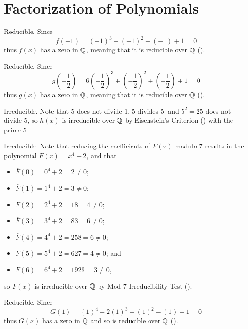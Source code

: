 \section{Factorization of Polynomials}
\begin{questions}
    \item \begin{partquestions}{\alph*}
        \item Reducible. Since
        \[
            f(-1) = (-1)^3 + (-1)^2 + (-1) + 1 = 0
        \]
        thus $f(x)$ has a zero in $\mathbb{Q}$, meaning that it is reducible over $\mathbb{Q}$ ().
        
        \item Reducible. Since
        \[
            g\left(-\frac12\right) = 6\left(-\frac12\right)^3 + \left(-\frac12\right)^2 + \left(-\frac12\right) + 1 = 0
        \]
        thus $g(x)$ has a zero in $\mathbb{Q}$, meaning that it is reducible over $\mathbb{Q}$ ().

        \item Irreducible. Note that 5 does not divide 1, 5 divides 5, and $5^2 = 25$ does not divide 5, so $h(x)$ is irreducible over $\mathbb{Q}$ by Eisenstein's Criterion () with the prime 5.
        
        \item Irreducible. Note that reducing the coefficients of $F(x)$ modulo 7 results in the polynomial $\bar{F}(x) = x^4 + 2$, and that
        \begin{itemize}
            \item $\bar{F}(0) = 0^4 + 2 = 2 \neq 0$;
            \item $\bar{F}(1) = 1^4 + 2 = 3 \neq 0$;
            \item $\bar{F}(2) = 2^4 + 2 = 18 = 4 \neq 0$;
            \item $\bar{F}(3) = 3^4 + 2 = 83 = 6 \neq 0$;
            \item $\bar{F}(4) = 4^4 + 2 = 258 = 6 \neq 0$;
            \item $\bar{F}(5) = 5^4 + 2 = 627 = 4 \neq 0$; and
            \item $\bar{F}(6) = 6^4 + 2 = 1928 = 3 \neq 0$,
        \end{itemize}
        so $F(x)$ is irreducible over $\mathbb{Q}$ by Mod 7 Irreducibility Test ().

        \item Reducible. Since
        \[
            G(1) = (1)^4 - 2(1)^3 + (1)^2 - (1) + 1 = 0
        \]
        thus $G(x)$ has a zero in $\mathbb{Q}$ and so is reducible over $\mathbb{Q}$ ().


\end{partquestions}
\end{questions}
